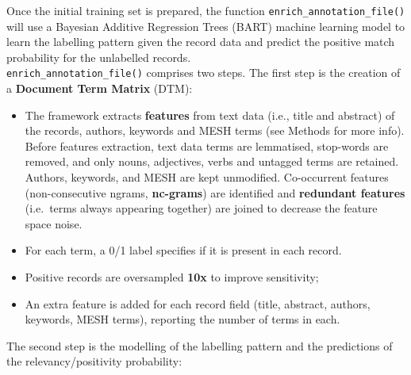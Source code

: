 \documentclass[
]{article}
\providecommand{\tightlist}{%
  \setlength{\itemsep}{0pt}\setlength{\parskip}{0pt}}
\begin{document}
Once the initial training set is prepared, the function
\texttt{enrich\_annotation\_file()} will use a Bayesian Additive
Regression Trees (BART) machine learning model to learn the labelling
pattern given the record data and predict the positive match probability
for the unlabelled records.\\
\texttt{enrich\_annotation\_file()} comprises two steps. The first step
is the creation of a \textbf{Document Term Matrix} (DTM):

\begin{itemize}
\tightlist
\item
  The framework extracts \textbf{features} from text data (i.e., title
  and abstract) of the records, authors, keywords and MESH terms (see
  Methods for more info). Before features extraction, text data terms
  are lemmatised, stop-words are removed, and only nouns, adjectives,
  verbs and untagged terms are retained. Authors, keywords, and MESH are
  kept unmodified. Co-occurrent features (non-consecutive ngrams,
  \textbf{nc-grams}) are identified and \textbf{redundant features}
  (i.e.~terms always appearing together) are joined to decrease the
  feature space noise.
\item
  For each term, a 0/1 label specifies if it is present in each record.
\item
  Positive records are oversampled \textbf{10x} to improve sensitivity;
\item
  An extra feature is added for each record field (title, abstract,
  authors, keywords, MESH terms), reporting the number of terms in each.
\end{itemize}

The second step is the modelling of the labelling pattern and the
predictions of the relevancy/positivity probability:
\end{document}
